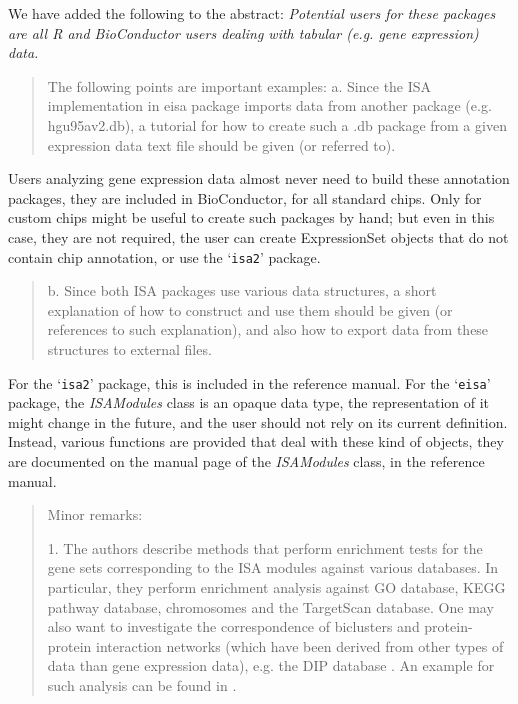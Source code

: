 \documentclass[a4paper]{article}
\newcommand{\Rpackage}[1]{`\texttt{#1}'}
\newcommand{\Rclass}[1]{\textsl{#1}}
\begin{document}
We have added the following to the abstract:
\textsl{
Potential users for these packages are all R and
BioConductor users dealing with tabular (e.g. gene expression) data.
}

\begin{quote}
The following points are important examples: 
a.      Since the ISA implementation in eisa package imports data from
another package (e.g. hgu95av2.db), a tutorial for how to create such
a .db package from a given expression data text file should be given
(or referred to). 
\end{quote}

Users analyzing gene expression data almost never need to build
these annotation packages, they are included in BioConductor, for all
standard chips. Only for custom chips might be useful to create such
packages by hand; but even in this case, they are not required, the
user can create ExpressionSet objects that do not contain chip
annotation, or use the \Rpackage{isa2} package.

\begin{quote}
b.      Since both ISA packages use various data structures, a short
explanation of how to construct and use them should be given (or
references to such explanation), and also how to export data from
these structures to external files. 
\end{quote}

For the \Rpackage{isa2} package, this is included in the reference
manual. For the \Rpackage{eisa} package, the \Rclass{ISAModules} class
is an opaque data type, the representation of it might change in the
future, and the user should not rely on its current
definition. Instead, various functions are provided that deal with
these kind of objects, they are documented on the manual page of the
\Rclass{ISAModules} class, in the reference manual.

\begin{quote}
Minor remarks:

1.      The authors describe methods that perform enrichment tests for
the gene sets corresponding to the ISA modules against various
databases. In particular, they perform enrichment analysis against GO
database, KEGG pathway database, chromosomes and the TargetScan \citep{targetscan}
database. One may also want to investigate the correspondence of
biclusters and protein-protein interaction networks (which have been
derived from other types of data than gene expression data), e.g. the
DIP database \citep{salwinski04}. An example for such analysis can be
found in \citet{prelic06}.
\end{quote}
\end{document}

